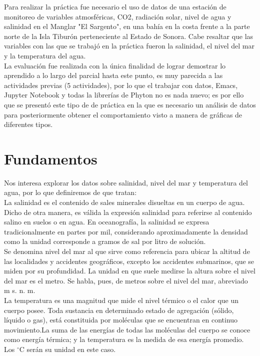 \documentclass[12pt]{article}
\begin{document}
Para realizar la práctica fue necesario el uso de datos de una estación de monitoreo de variables atmosféricas, CO2, radiación solar, nivel de agua y salinidad en el Manglar "El Sargento", en una bahía en la costa frente a la parte norte de la Isla Tiburón perteneciente al Estado de Sonora. Cabe resaltar que las variables con las que se trabajó en la práctica fueron la salinidad, el nivel del mar y la temperatura del agua.\\

La evaluación fue realizada con la única finalidad de lograr demostrar lo aprendido a lo largo del parcial hasta este punto, es muy parecida a las actividades previas (5 actividades), por lo que el trabajar con datos, Emacs, Jupyter Notebook y todas la librerías de Phyton no es nada nuevo; es por ello que se presentó este tipo de de práctica en la que es necesario un análisis de datos para posteriormente obtener el comportamiento visto a manera de gráficas de diferentes tipos.
\section*{Fundamentos}
Nos interesa explorar los datos sobre salinidad, nivel del mar y temperatura del agua, por lo que definiremos de que tratan:\\

La salinidad es el contenido de sales minerales disueltas en un cuerpo de agua. Dicho de otra manera, es válida la expresión salinidad para referirse al contenido salino en suelos o en agua. En oceanografía, la salinidad se expresa tradicionalmente en partes por mil, considerando aproximadamente la densidad como la unidad corresponde a gramos de sal por litro de solución.\\

Se denomina nivel del mar al que sirve como referencia para ubicar la altitud de las localidades y accidentes geográficos, excepto los accidentes submarinos, que se miden por su profundidad. La unidad en que suele medirse la altura sobre el nivel del mar es el metro. Se habla, pues, de metros sobre el nivel del mar, abreviado m s. n. m.\\

La temperatura es una magnitud que mide el nivel térmico o el calor que un cuerpo posee. Toda sustancia en determinado estado de agregación (sólido, líquido o gas), está constituida por moléculas que se encuentran en continuo movimiento.La suma de las energías de todas las moléculas del cuerpo se conoce como energía térmica; y la temperatura es la medida de esa energía promedio. Los  $^{\circ}$C serán su unidad en este caso.
\end{document}

